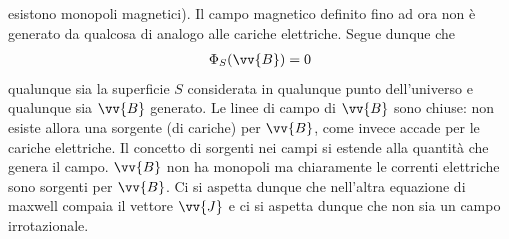 \documentclass[a4paper, oneside]{article}
\begin{document}
esistono monopoli magnetici). Il campo magnetico definito fino ad ora 
non è generato da qualcosa di analogo alle cariche elettriche. Segue dunque che 
\begin{gather*}
    \Phi _S(\vv{B} ) = 0
\end{gather*}
qualunque sia la superficie $S$ considerata in qualunque punto dell'universo e 
qualunque sia $\vv{B}$ generato. Le linee di campo di $\vv{B}$ sono chiuse: non esiste 
allora una sorgente (di cariche) per $\vv{B}$, come invece accade per le cariche elettriche.   
Il concetto di sorgenti nei campi si estende alla quantità che genera il campo. $\vv{B}$ non ha monopoli
ma chiaramente le correnti elettriche sono sorgenti per $\vv{B}$. Ci si aspetta dunque 
che nell'altra equazione di maxwell compaia il vettore $\vv{J}$ e ci si aspetta dunque 
che non sia un campo irrotazionale.    
\end{document}
